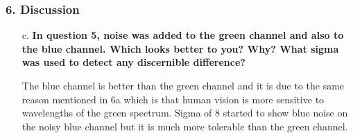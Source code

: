 	\begin{frame}[t]
		\frametitle{6. Discussion}
		
		\begin{normalsize}
			\begin{itemize}
				\setlength\itemsep{1em}
				
				\item[c.] \textbf{In question 5, noise was added to the green channel and also to the blue channel.  Which looks better to you? Why?  What sigma was used to detect any discernible difference?}

				\item[] The blue channel is better than the green channel and it is due to the same reason mentioned in 6a which is that human vision is more sensitive to wavelengths of the green spectrum. Sigma of 8 started to show blue noise on the noisy blue channel but it is much more tolerable than the green channel.
				
			\end{itemize}
		\end{normalsize}
		
	\end{frame}
	
